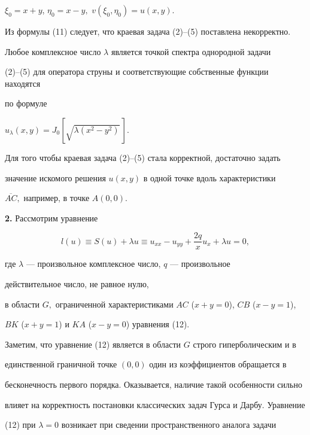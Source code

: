 $\xi_0=x+y$, $\eta_0=x-y,$ $v(\xi_0,\eta_0)=u(x,y).$


\medskip





Из формулы (11) следует, что краевая задача (2)--(5) поставлена некорректно.


Любое комплексное число $\lambda$ является точкой спектра однородной задачи


(2)--(5) для оператора струны и соответствующие собственные функции находятся


по формуле


$u_\lambda (x,y)=J_0[\sqrt{\lambda (x^2-y^2)}\,].$


Для того чтобы краевая задача (2)--(5) стала корректной, достаточно задать


значение искомого решения $u(x,y)$ в одной точке вдоль характеристики


$\overline {AC},$ например, в точке $A(0,0).$


\medskip





{\bf 2.} Рассмотрим уравнение


\begin{equation}


l(u)\equiv S(u)+\lambda u\equiv u_{xx}-u_{yy}+\frac{2q}{x}u_x+\lambda


u=0,


\end{equation}


где $\lambda$ --- произвольное комплексное число, $q$ --- произвольное


действительное число, не равное нулю,


в области $G,$ ограниченной характеристиками $AC$ ($x+y=0$), $CB$ ($x-y=1$),


$BK$ ($x+y=1$) и $KA$ ($x-y=0$) уравнения (12).





Заметим, что уравнение (12) является в области $G$ строго гиперболическим и в


единственной граничной точке $(0,0)$ один из коэффициентов обращается в


бесконечность первого порядка. Оказывается, наличие такой особенности сильно


влияет на корректность постановки классических задач Гурса и Дарбу. Уравнение


(12) при $\lambda =0$ возникает при сведении пространственного аналога задачи


